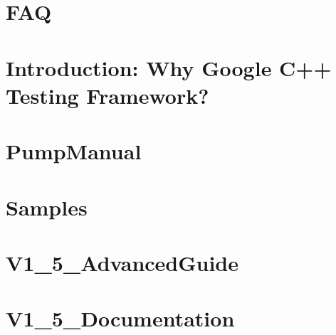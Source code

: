 \documentclass[twoside]{book}
\newcommand{\+}{\discretionary{\mbox{\scriptsize$\hookleftarrow$}}{}{}}
\begin{document}
\chapter{F\+AQ}
\label{md__home_bhargavi_Documents_SDR_Copy_Exam_808X_vendor_googletest_googletest_docs_FAQ}
\hypertarget{md__home_bhargavi_Documents_SDR_Copy_Exam_808X_vendor_googletest_googletest_docs_FAQ}{}

\chapter{Introduction\+: Why Google C++ Testing Framework?}
\label{md__home_bhargavi_Documents_SDR_Copy_Exam_808X_vendor_googletest_googletest_docs_Primer}
\hypertarget{md__home_bhargavi_Documents_SDR_Copy_Exam_808X_vendor_googletest_googletest_docs_Primer}{}

\chapter{Pump\+Manual}
\label{md__home_bhargavi_Documents_SDR_Copy_Exam_808X_vendor_googletest_googletest_docs_PumpManual}
\hypertarget{md__home_bhargavi_Documents_SDR_Copy_Exam_808X_vendor_googletest_googletest_docs_PumpManual}{}

\chapter{Samples}
\label{md__home_bhargavi_Documents_SDR_Copy_Exam_808X_vendor_googletest_googletest_docs_Samples}
\hypertarget{md__home_bhargavi_Documents_SDR_Copy_Exam_808X_vendor_googletest_googletest_docs_Samples}{}

\chapter{V1\+\_\+5\+\_\+\+Advanced\+Guide}
\label{md__home_bhargavi_Documents_SDR_Copy_Exam_808X_vendor_googletest_googletest_docs_V1_5_AdvancedGuide}
\hypertarget{md__home_bhargavi_Documents_SDR_Copy_Exam_808X_vendor_googletest_googletest_docs_V1_5_AdvancedGuide}{}

\chapter{V1\+\_\+5\+\_\+\+Documentation}
\label{md__home_bhargavi_Documents_SDR_Copy_Exam_808X_vendor_googletest_googletest_docs_V1_5_Documentation}
\hypertarget{md__home_bhargavi_Documents_SDR_Copy_Exam_808X_vendor_googletest_googletest_docs_V1_5_Documentation}{}

\end{document}
